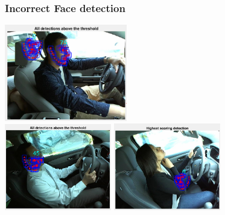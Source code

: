 \documentclass{beamer}
\begin{document}
	\begin{frame}
		\frametitle{Incorrect Face detection}
		\begin{center}
			\includegraphics[width=0.4\textwidth]{faces/face3} \\ \vspace{0.1cm}
			\includegraphics[width=0.35\textwidth]{faces/face5} \hspace{0.1cm}
			\includegraphics[width=0.35\textwidth]{faces/face7}
		\end{center}		
	\end{frame}
	
\end{document}
